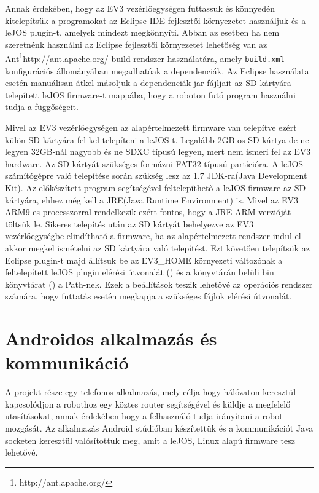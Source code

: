 Annak érdekében, hogy az EV3 vezérlőegységen futtassuk és könnyedén kitelepítsük a programokat az Eclipse IDE fejlesztői környezetet használjuk és a leJOS plugin-t, amelyek mindezt megkönnyíti. Abban az esetben ha nem szeretnénk használni az Eclipse fejlesztői környezetet lehetőség van az Ant\footnote{http://ant.apache.org/}{http://ant.apache.org/} build rendszer használatára, amely \texttt{build.xml} konfigurációs állományában megadhatóak a dependenciák. Az Eclipse használata esetén manuálisan átkel másoljuk a dependenciák jar fájljait az SD kártyára telepített leJOS firmware-t  mappába, hogy a roboton futó program használni tudja a függőségeit.

Mivel az EV3 vezérlőegységen az alapértelmezett firmware van telepítve ezért külön SD kártyára fel kel telepíteni a leJOS-t. Legalább 2GB-os SD kártya de ne legyen 32GB-nál nagyobb és ne SDXC típusú legyen, mert nem ismeri fel az EV3 hardware. Az SD kártyát szükséges formázni FAT32 típusú partícióra. A leJOS számítógépre való telepítése során szükség lesz az 1.7 JDK-ra(Java Development Kit). Az előkészített program segítségével feltelepíthető a leJOS firmware az SD kártyára, ehhez még kell a JRE(Java Runtime Environment) is. Mivel az EV3 ARM9-es processzorral rendelkezik ezért fontos, hogy a JRE ARM verzióját töltsük le. Sikeres telepítés után az SD kártyát behelyezve az EV3 vezérlőegységbe elindítható a firmware, ha az alapértelmezett rendszer indul el akkor megkel ismételni az SD kártyára való telepítést. Ezt követően telepítsük az Eclipse plugin-t majd állítsuk be az EV3\_HOME környezeti változónak a feltelepített leJOS plugin elérési útvonalát () és a könyvtárán belüli bin könyvtárat () a Path-nek. Ezek a beállítások teszik lehetővé az operációs rendszer számára, hogy futtatás esetén megkapja a szükséges fájlok elérési útvonalát.

\section{Androidos alkalmazás és kommunikáció}\label{sec:MEGVALOSITAS:android}
A projekt része egy telefonos alkalmazás, mely célja hogy hálózaton keresztül kapcsolódjon a robothoz egy köztes router segítségével és küldje a megfelelő utasításokat, annak érdekében hogy a felhasználó tudja irányítani a robot mozgását. Az alkalmazás Android stúdióban készítettük és a kommunikációt Java socketen keresztül valósítottuk meg, amit a leJOS, Linux alapú firmware tesz lehetővé.

